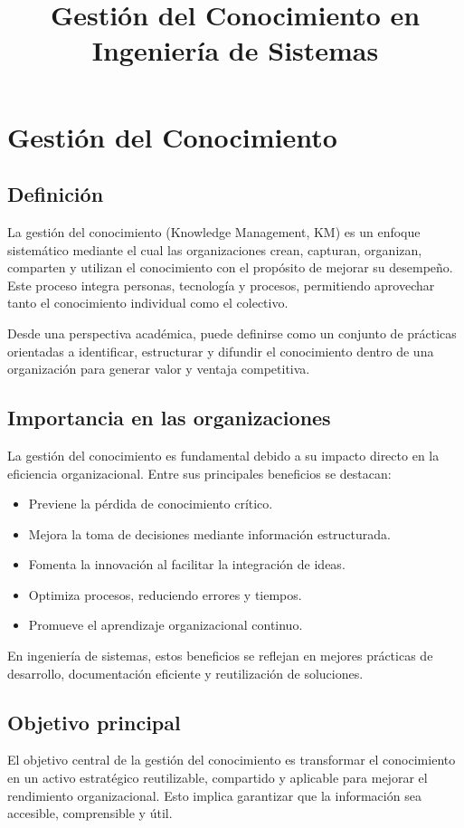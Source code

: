 \documentclass[12pt,a4paper]{article}
\title{Gestión del Conocimiento en Ingeniería de Sistemas}
\author{}
\date{}
\begin{document}
\maketitle

\section{Gestión del Conocimiento}

\subsection{Definición}
La gestión del conocimiento (Knowledge Management, KM) es un enfoque sistemático mediante el cual las organizaciones crean, capturan, organizan, comparten y utilizan el conocimiento con el propósito de mejorar su desempeño. Este proceso integra personas, tecnología y procesos, permitiendo aprovechar tanto el conocimiento individual como el colectivo.

Desde una perspectiva académica, puede definirse como un conjunto de prácticas orientadas a identificar, estructurar y difundir el conocimiento dentro de una organización para generar valor y ventaja competitiva.

\subsection{Importancia en las organizaciones}
La gestión del conocimiento es fundamental debido a su impacto directo en la eficiencia organizacional. Entre sus principales beneficios se destacan:

\begin{itemize}
    \item Previene la pérdida de conocimiento crítico.
    \item Mejora la toma de decisiones mediante información estructurada.
    \item Fomenta la innovación al facilitar la integración de ideas.
    \item Optimiza procesos, reduciendo errores y tiempos.
    \item Promueve el aprendizaje organizacional continuo.
\end{itemize}

En ingeniería de sistemas, estos beneficios se reflejan en mejores prácticas de desarrollo, documentación eficiente y reutilización de soluciones.

\subsection{Objetivo principal}
El objetivo central de la gestión del conocimiento es transformar el conocimiento en un activo estratégico reutilizable, compartido y aplicable para mejorar el rendimiento organizacional. Esto implica garantizar que la información sea accesible, comprensible y útil.
\end{document}
